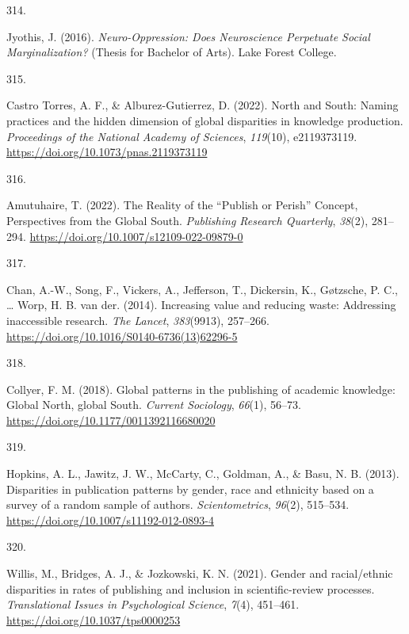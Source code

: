\documentclass[
  11pt,
  letterpaper,
]{scrreprt}
\newlength{\cslhangindent}
\newlength{\csllabelwidth}
\newenvironment{CSLReferences}[2] %
 {\begin{list}{}{%
  \setlength{\itemindent}{0pt}
  \setlength{\leftmargin}{0pt}
  \setlength{\parsep}{0pt}
  \ifodd #1
   \setlength{\leftmargin}{\cslhangindent}
   \setlength{\itemindent}{-1\cslhangindent}
  \fi
  \setlength{\itemsep}{#2\baselineskip}}}
 {\end{list}}
\newcommand{\CSLLeftMargin}[1]{\parbox[t]{\csllabelwidth}{\strut#1\strut}}
\newcommand{\CSLRightInline}[1]{\parbox[t]{\linewidth - \csllabelwidth}{\strut#1\strut}}
\begin{document}
\begin{CSLReferences}{0}{0}
\CSLLeftMargin{314. }%
\CSLRightInline{Jyothis, J. (2016). \emph{Neuro-{Oppression}: {Does
Neuroscience Perpetuate Social Marginalization}?} (Thesis for Bachelor
of Arts). Lake Forest College.}

\CSLLeftMargin{315. }%
\CSLRightInline{Castro Torres, A. F., \& Alburez-Gutierrez, D. (2022).
North and {South}: {Naming} practices and the hidden dimension of global
disparities in knowledge production. \emph{Proceedings of the National
Academy of Sciences}, \emph{119}(10), e2119373119.
\url{https://doi.org/10.1073/pnas.2119373119}}

\CSLLeftMargin{316. }%
\CSLRightInline{Amutuhaire, T. (2022). The {Reality} of the {``{Publish}
or {Perish}''} {Concept}, {Perspectives} from the {Global South}.
\emph{Publishing Research Quarterly}, \emph{38}(2), 281--294.
\url{https://doi.org/10.1007/s12109-022-09879-0}}

\CSLLeftMargin{317. }%
\CSLRightInline{Chan, A.-W., Song, F., Vickers, A., Jefferson, T.,
Dickersin, K., Gøtzsche, P. C., \ldots{} Worp, H. B. van der. (2014).
Increasing value and reducing waste: Addressing inaccessible research.
\emph{The Lancet}, \emph{383}(9913), 257--266.
\url{https://doi.org/10.1016/S0140-6736(13)62296-5}}

\CSLLeftMargin{318. }%
\CSLRightInline{Collyer, F. M. (2018). Global patterns in the publishing
of academic knowledge: {Global North}, global {South}. \emph{Current
Sociology}, \emph{66}(1), 56--73.
\url{https://doi.org/10.1177/0011392116680020}}

\CSLLeftMargin{319. }%
\CSLRightInline{Hopkins, A. L., Jawitz, J. W., McCarty, C., Goldman, A.,
\& Basu, N. B. (2013). Disparities in publication patterns by gender,
race and ethnicity based on a survey of a random sample of authors.
\emph{Scientometrics}, \emph{96}(2), 515--534.
\url{https://doi.org/10.1007/s11192-012-0893-4}}

\CSLLeftMargin{320. }%
\CSLRightInline{Willis, M., Bridges, A. J., \& Jozkowski, K. N. (2021).
Gender and racial/ethnic disparities in rates of publishing and
inclusion in scientific-review processes. \emph{Translational Issues in
Psychological Science}, \emph{7}(4), 451--461.
\url{https://doi.org/10.1037/tps0000253}}


\end{CSLReferences}
\end{document}
